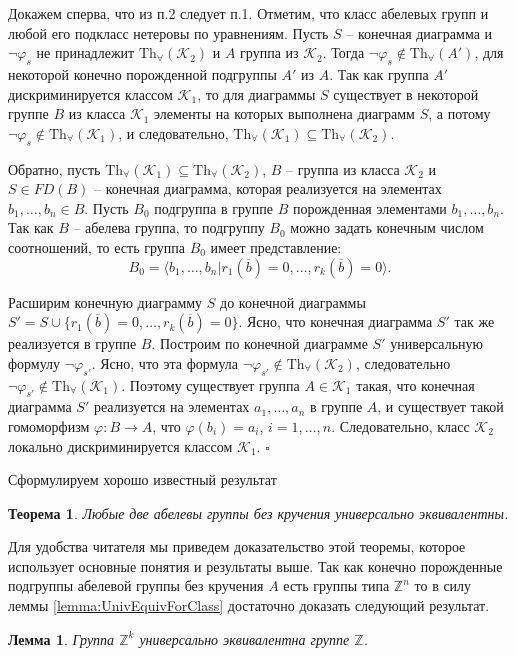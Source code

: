 \documentclass[a4paper,11pt,twoside]{article}
\newtheorem{theorem}{Теорема}[section]
\newtheorem{lemma}{Лемма}[section]
\def\proof{{\noindent{\bf Доказательство.}} }
\def\K{{\mathcal{K}}}
\def\Z{{\mathbb{Z}}}
\def\Tha{{\mathrm{Th}_\forall}}
\begin{document}
\proof Докажем сперва, что из п.2 следует п.1. Отметим, что класс абелевых групп и любой его подкласс нетеровы по уравнениям. Пусть $S$ -- конечная диаграмма и $\neg \varphi_s$ не принадлежит $\Tha(\K_2)$ и $A$ группа из $\K_2$. Тогда $\neg \varphi_s \notin \Tha(A')$, для некоторой конечно порожденной подгруппы $A'$ из $A$. Так как группа $A'$ дискриминируется классом $\K_1$, то для диаграммы $S$ существует в некоторой группе $B$ из класса $\K_1$ элементы на которых выполнена диаграмм $S$, а потому $\neg \varphi_s \notin \Tha(\K_1)$, и следовательно, $\Tha(\K_1) \subseteq \Tha(\K_2)$.

Обратно, пусть $\Tha(\K_1) \subseteq \Tha(\K_2)$, $B$ -- группа из класса $\K_2$ и $S \in FD(B)$ -- конечная диаграмма, которая реализуется на элементах $b_1, \ldots, b_n \in B$. Пусть $B_0$ подгруппа в группе $B$ порожденная элементами $b_1, \ldots, b_n$. Так как $B$ -- абелева группа, то подгруппу $B_0$ можно задать конечным числом соотношений, то есть группа $B_0$ имеет представление:
 $$B_0 = \langle b_1, \ldots, b_n | r_1(\overline{b}) = 0, \ldots, r_k(\overline{b}) = 0 \rangle.$$

Расширим конечную диаграмму $S$ до конечной диаграммы $S' = S \cup \{r_1(\overline{b}) = 0, \ldots, r_k(\overline{b}) = 0\}$. Ясно, что конечная диаграмма $S'$ так же реализуется в группе $B$. Построим по конечной диаграмме $S'$ универсальную формулу $\neg\varphi_{s'}$. Ясно, что эта формула $\neg\varphi_{s'} \notin \Tha(\K_2)$, следовательно $\neg\varphi_{s'} \notin \Tha(\K_1)$. Поэтому существует группа $A \in \K_1$ такая, что конечная диаграмма $S'$ реализуется на элементах $a_1, \ldots, a_n$ в группе $A$, и существует такой гомоморфизм $\varphi: B \rightarrow A$, что $\varphi(b_i) = a_i$, $i = 1, \ldots, n$. Следовательно, класс $\K_2$ локально дискриминируется классом $\K_1$. $\square$

Сформулируем хорошо известный результат

\begin{theorem}\label{th:AbelUnivEquiv}
Любые две абелевы группы без кручения универсально эквивалентны.
\end{theorem}

Для удобства читателя мы приведем доказательство этой теоремы, которое использует основные понятия и результаты выше. Так как конечно порожденные подгруппы абелевой группы без кручения $A$ есть группы типа $\Z^n$ то в силу леммы \ref{lemma:UnivEquivForClass} достаточно доказать следующий результат.

\begin{lemma}\label{lemma:UnivEquivZk}
Группа $\Z^k$ универсально эквивалентна группе $\Z$.
\end{lemma}
\end{document}
